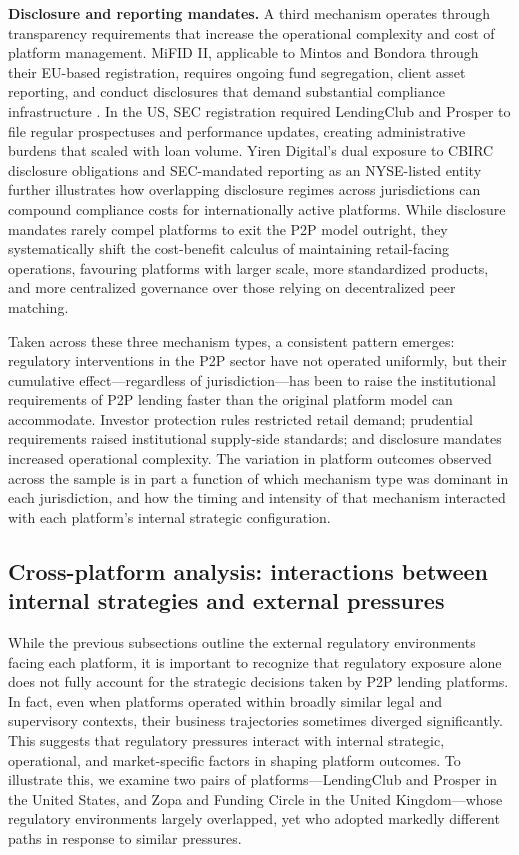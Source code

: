 \documentclass[pdflatex,sn-apa]{sn-jnl}%
\theoremstyle{thmstyleone}%
\theoremstyle{thmstyletwo}%
\theoremstyle{thmstylethree}%
\begin{document}
\textcolor{NavyBlue}{\textbf{Disclosure and reporting mandates.} A third mechanism operates through transparency requirements that increase the operational complexity and cost of platform management. MiFID II, applicable to Mintos and Bondora through their EU-based registration, requires ongoing fund segregation, client asset reporting, and conduct disclosures that demand substantial compliance infrastructure \citep{european_securities_and_markets_authority_mifid_2014}. In the US, SEC registration required LendingClub and Prosper to file regular prospectuses and performance updates, creating administrative burdens that scaled with loan volume. Yiren Digital's dual exposure to CBIRC disclosure obligations and SEC-mandated reporting as an NYSE-listed entity further illustrates how overlapping disclosure regimes across jurisdictions can compound compliance costs for internationally active platforms. While disclosure mandates rarely compel platforms to exit the P2P model outright, they systematically shift the cost-benefit calculus of maintaining retail-facing operations, favouring platforms with larger scale, more standardized products, and more centralized governance over those relying on decentralized peer matching.}

\textcolor{NavyBlue}{Taken across these three mechanism types, a consistent pattern emerges: regulatory interventions in the P2P sector have not operated uniformly, but their cumulative effect—regardless of jurisdiction—has been to raise the institutional requirements of P2P lending faster than the original platform model can accommodate. Investor protection rules restricted retail demand; prudential requirements raised institutional supply-side standards; and disclosure mandates increased operational complexity. The variation in platform outcomes observed across the sample is in part a function of which mechanism type was dominant in each jurisdiction, and how the timing and intensity of that mechanism interacted with each platform's internal strategic configuration.}

\subsection{Cross-platform analysis: interactions between internal strategies and external pressures}
\textcolor{NavyBlue}{
While the previous subsections outline the external regulatory environments facing each platform, it is important to recognize that regulatory exposure alone does not fully account for the strategic decisions taken by P2P lending platforms. In fact, even when platforms operated within broadly similar legal and supervisory contexts, their business trajectories sometimes diverged significantly. This suggests that regulatory pressures interact with internal strategic, operational, and market-specific factors in shaping platform outcomes. To illustrate this, we examine two pairs of platforms—LendingClub and Prosper in the United States, and Zopa and Funding Circle in the United Kingdom—whose regulatory environments largely overlapped, yet who adopted markedly different paths in response to similar pressures.
}
\end{document}
